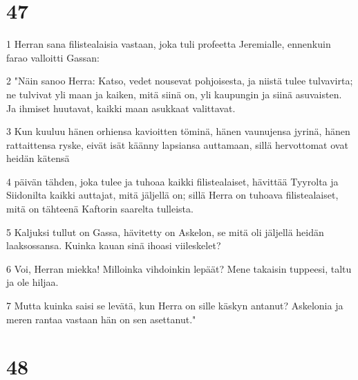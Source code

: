 \chapter{47}

\par 1 Herran sana filistealaisia vastaan, joka tuli profeetta Jeremialle, ennenkuin farao valloitti Gassan:
\par 2 "Näin sanoo Herra: Katso, vedet nousevat pohjoisesta, ja niistä tulee tulvavirta; ne tulvivat yli maan ja kaiken, mitä siinä on, yli kaupungin ja siinä asuvaisten. Ja ihmiset huutavat, kaikki maan asukkaat valittavat.
\par 3 Kun kuuluu hänen orhiensa kavioitten töminä, hänen vaunujensa jyrinä, hänen rattaittensa ryske, eivät isät käänny lapsiansa auttamaan, sillä hervottomat ovat heidän kätensä
\par 4 päivän tähden, joka tulee ja tuhoaa kaikki filistealaiset, hävittää Tyyrolta ja Siidonilta kaikki auttajat, mitä jäljellä on; sillä Herra on tuhoava filistealaiset, mitä on tähteenä Kaftorin saarelta tulleista.
\par 5 Kaljuksi tullut on Gassa, hävitetty on Askelon, se mitä oli jäljellä heidän laaksossansa. Kuinka kauan sinä ihoasi viileskelet?
\par 6 Voi, Herran miekka! Milloinka vihdoinkin lepäät? Mene takaisin tuppeesi, taltu ja ole hiljaa.
\par 7 Mutta kuinka saisi se levätä, kun Herra on sille käskyn antanut? Askelonia ja meren rantaa vastaan hän on sen asettanut."

\chapter{48}

